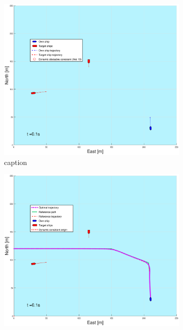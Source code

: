 \clearpage
\begin{figure}[!b] %
    \begin{subfigure}[b]{0.49\textwidth}
        \centering
        \includegraphics[width=\textwidth]{Images/Figures/Havn1/_Simple_1fig1_time=0}
        \caption{caption}
    \end{subfigure}
    \hfill
    \begin{subfigure}[b]{0.499\textwidth}
        \centering
        \includegraphics[width=\textwidth]{Images/Figures/Havn1/_Simple_1fig999_time=0}

\end{subfigure}
\end{figure}
